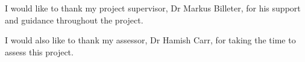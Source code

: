 I would like to thank my project supervisor, Dr Markus Billeter, for his support and guidance throughout the project.\newline

I would also like to thank my assessor, Dr Hamish Carr, for taking the time to assess this project.